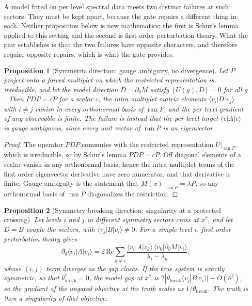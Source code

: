 \documentclass[10pt,a4paper]{amsart}
\newtheorem{prop}{Proposition}
\newcommand{\comm}[2]{[#1,#2]}
\begin{document}
A model fitted on per level spectral data meets two distinct failures at such
sectors. They must be kept apart, because the gate repairs a different thing in
each. Neither proposition below is new mathematics; the first is Schur's lemma
applied to this setting and the second is first order perturbation theory. What
the pair establishes is that the two failures have opposite characters, and
therefore require opposite repairs, which is what the gate provides.

\begin{prop}[Symmetric direction: gauge ambiguity, no divergence]
\label{prop:sym}
Let $P$ project onto a forced multiplet on which the restricted representation
is irreducible, and let the model direction $D=\partial_\theta M$ satisfy
$\comm{U(g)}{D}=0$ for all $g$. Then $PDP=cP$ for a scalar $c$, the intra
multiplet matrix elements $\langle v_i|D|v_j\rangle$ with $i\ne j$ vanish in
every orthonormal basis of $\operatorname{ran}P$, and the per level gradient of
any observable is finite. The failure is instead that the per level target
$\langle v|A|v\rangle$ is gauge ambiguous, since every unit vector of
$\operatorname{ran}P$ is an eigenvector.
\end{prop}
\begin{proof}
The operator $PDP$ commutes with the restricted representation
$U|_{\operatorname{ran}P}$, which is irreducible, so by Schur's lemma $PDP=cP$.
Off diagonal elements of a scalar vanish in any orthonormal basis, hence the
intra multiplet terms of the first order eigenvector derivative have zero
numerator, and that derivative is finite. Gauge ambiguity is the statement that
$M(x)|_{\operatorname{ran}P}=\lambda P$, so any orthonormal basis of
$\operatorname{ran}P$ diagonalizes the restriction.
\end{proof}


\begin{prop}[Symmetry breaking direction: singularity at a protected crossing]
\label{prop:break}
Let levels $i$ and $j$ in different symmetry sectors cross at $x^\ast$, and let
$D=B$ couple the sectors, with $\langle v_j|B|v_i\rangle\ne0$. For a simple level
$i$, first order perturbation theory gives
\[
\partial_\theta\langle v_i|A|v_i\rangle
=2\,\mathrm{Re}\!\!\sum_{k\ne i}
\frac{\langle v_i|A|v_k\rangle\,\langle v_k|\partial_\theta M|v_i\rangle}
{\lambda_i-\lambda_k},
\]
whose $(i,j)$ term diverges as the gap closes. If the true system is exactly
symmetric, so that $\theta^\ast_{\mathrm{break}}=0$, the model gap at $x^\ast$ is
$2|\theta_{\mathrm{break}}\langle v_j|B|v_i\rangle|+O(\theta^2)$, so the gradient
of the ungated objective at the truth scales as $1/\theta_{\mathrm{break}}$. The
truth is then a singularity of that objective.
\end{prop}
\end{document}
